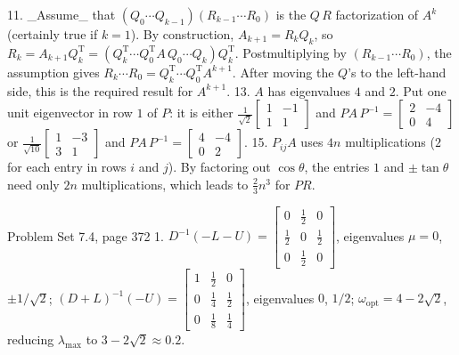 11. _Assume_ that \((Q_{0}\cdots Q_{k-1})(R_{k-1}\cdots R_{0})\) is the \(Q\,R\) factorization of \(A^{k}\) (certainly true if \(k=1\)). By construction, \(A_{k+1}=R_{k}Q_{k}\), so \(R_{k}=A_{k+1}Q_{k}^{\mathrm{T}}=(Q_{k}^{\mathrm{T}}\cdots Q_{0}^{\mathrm{T}}A \,Q_{0}\cdots Q_{k})Q_{k}^{\mathrm{T}}\). Postmultiplying by \((R_{k-1}\cdots R_{0})\), the assumption gives \(R_{k}\cdots R_{0}=Q_{k}^{\mathrm{T}}\cdots Q_{0}^{\mathrm{T}}A^{k+1}\). After moving the \(Q\)'s to the left-hand side, this is the required result for \(A^{k+1}\).
13. \(A\) has eigenvalues \(4\) and \(2\). Put one unit eigenvector in row \(1\) of \(P\): it is either \(\frac{1}{\sqrt{2}}\begin{bmatrix}1&-1\\ 1&1\end{bmatrix}\) and \(PA\,P^{-1}=\begin{bmatrix}2&-4\\ 0&4\end{bmatrix}\) or \(\frac{1}{\sqrt{10}}\begin{bmatrix}1&-3\\ 3&1\end{bmatrix}\) and \(PA\,P^{-1}=\begin{bmatrix}4&-4\\ 0&2\end{bmatrix}\).
15. \(P_{ij}A\) uses \(4n\) multiplications (\(2\) for each entry in rows \(i\) and \(j\)). By factoring out \(\cos\theta\), the entries \(1\) and \(\pm\tan\theta\) need only \(2n\) multiplications, which leads to \(\frac{2}{3}n^{3}\) for \(PR\).

Problem Set 7.4, page 372
1. \(D^{-1}(-L-U)=\begin{bmatrix}0&\frac{1}{2}&0\\ \frac{1}{2}&0&\frac{1}{2}\\ 0&\frac{1}{2}&0\end{bmatrix}\), eigenvalues \(\mu=0\), \(\pm 1/\sqrt{2}\); \((D+L)^{-1}(-U)=\begin{bmatrix}1&\frac{1}{2}&0\\ 0&\frac{1}{4}&\frac{1}{2}\\ 0&\frac{1}{8}&\frac{1}{4}\end{bmatrix}\), eigenvalues \(0\), \(1/2\); \(\omega_{\mathrm{opt}}=4-2\sqrt{2}\), reducing \(\lambda_{\mathrm{max}}\) to \(3-2\sqrt{2}\approx 0.2\).

 